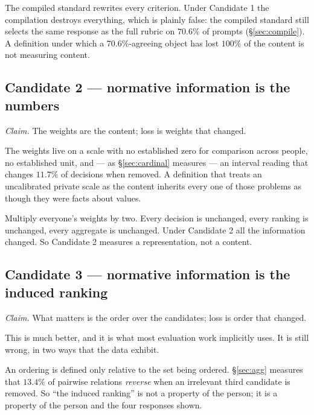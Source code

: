  The compiled standard rewrites
every criterion. Under Candidate 1 the compilation destroys everything, which is
plainly false: the compiled standard still selects the same response as the full
rubric on $70.6\%$ of prompts (§\ref{sec:compile}). A definition under which a
$70.6\%$-agreeing object has lost $100\%$ of the content is not measuring content.

\subsection{Candidate 2 --- normative information is the numbers}

\emph{Claim.} The weights are the content; loss is weights that changed.

\begin{proposition}
The weights live on a scale with no established zero for comparison across
people, no established unit, and --- as §\ref{sec:cardinal} measures --- an
interval reading that changes $11.7\%$ of decisions when removed. A definition
that treats an uncalibrated private scale as the content inherits every one of
those problems as though they were facts about values.
\end{proposition}

 Multiply everyone's weights by two. Every
decision is unchanged, every ranking is unchanged, every aggregate is unchanged.
Under Candidate 2 all the information changed. So Candidate 2 measures a
representation, not a content.

\subsection{Candidate 3 --- normative information is the induced ranking}

\emph{Claim.} What matters is the order over the candidates; loss is order that
changed.

This is much better, and it is what most evaluation work implicitly uses. It is
still wrong, in two ways that the data exhibit.

\begin{proposition}
\label{prop:cand3}
An ordering is defined only relative to the set being ordered. §\ref{sec:agg}
measures that $13.4\%$ of pairwise relations \emph{reverse} when an irrelevant
third candidate is removed. So ``the induced ranking'' is not a property of the
person; it is a property of the person and the four responses shown.
\end{proposition}

